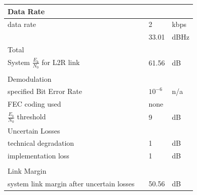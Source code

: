 \begin{table}[]
\begin{tabular}{llll}
\multicolumn{4}{l}{\cellcolor[HTML]{DAE8FC}Data Rate}                            \\ \hline
data rate                                 &      & 2                      & kbps \\
                                          &      & 33.01                  & dBHz \\ \hline
\multicolumn{4}{l}{\cellcolor[HTML]{DAE8FC}Total}                                \\ \hline
System $\frac{{E}_{b}}{{N}_{0}}$	 for L2R link &      & 61.56                  & dB   \\
\multicolumn{4}{l}{}                                                             \\ \hline
\multicolumn{4}{l}{\cellcolor[HTML]{DAE8FC}Demodulation}                         \\ \hline
specified Bit Error Rate                  &      & $10^{-6}$ 			  & n/a  \\
FEC coding used                           &      & none                   &      \\
$\frac{{E}_{b}}{{N}_{0}}$ threshold       &      & 9                      & dB   \\ \hline
\multicolumn{4}{l}{\cellcolor[HTML]{DAE8FC}Uncertain Losses}                     \\ \hline
technical degradation                     &      & 1                      & dB   \\
implementation loss                       &      & 1                      & dB   \\
\multicolumn{4}{l}{}                                                             \\ \hline
\multicolumn{4}{l}{\cellcolor[HTML]{DAE8FC}Link Margin}                          \\ \hline
system link margin after uncertain losses &      & 50.56                  & dB  
\end{tabular}
\end{table}

